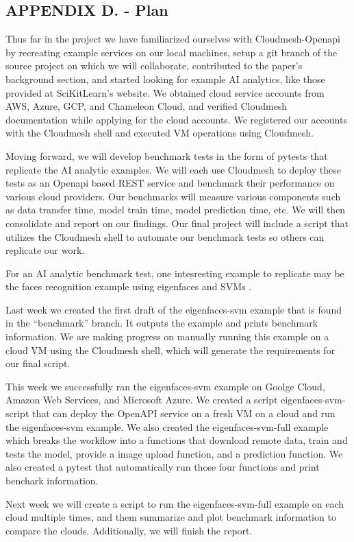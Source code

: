 \subsection{APPENDIX D. - Plan}\label{appendix-d.---plan}

Thus far in the project we have familiarized ourselves with
Cloudmesh-Openapi by recreating example services on our local machines,
setup a git branch of the source project on which we will collaborate,
contributed to the paper's background section, and started looking for
example AI analytics, like those provided at SciKitLearn's website. We
obtained cloud service accounts from AWS, Azure, GCP, and Chameleon
Cloud, and verified Cloudmesh documentation while applying for the cloud
accounts. We registered our accounts with the Cloudmesh shell and
executed VM operations using Cloudmesh.

Moving forward, we will develop benchmark tests in the form of pytests
that replicate the AI analytic examples. We will each use Cloudmesh to
deploy these tests as an Openapi based REST service and benchmark their
performance on various cloud providers. Our benchmarks will measure
various components such as data transfer time, model train time, model
prediction time, etc. We will then consolidate and report on our
findings. Our final project will include a script that utilizes the
Cloudmesh shell to automate our benchmark tests so others can replicate
our work.

For an AI analytic benchmark test, one intesresting example to replicate
may be the faces recognition example using eigenfaces and SVMs \cite{www-skikit-learn-faces}.

Last week we created the first draft of the eigenfaces-svm example that
is found in the ``benchmark'' branch. It outputs the example and prints
benchmark information. We are making progress on manually running this
example on a cloud VM using the Cloudmesh shell, which will generate the
requirements for our final script.

This week we successfully ran the eigenfaces-svm example on Goolge
Cloud, Amazon Web Services, and Microsoft Azure. We created a script
eigenfaces-svm-script that can deploy the OpenAPI service on a fresh VM
on a cloud and run the eigenfaces-svm example. We also created the
eigenfaces-svm-full example which breaks the workflow into a functions
that download remote data, train and tests the model, provide a image
upload function, and a prediction function. We also created a pytest
that automatically run those four functions and print benchark
information.

Next week we will create a script to run the eigenfaces-svm-full example
on each cloud multiple times, and them summarize and plot benchmark
information to compare the clouds. Additionally, we will finish the
report.
